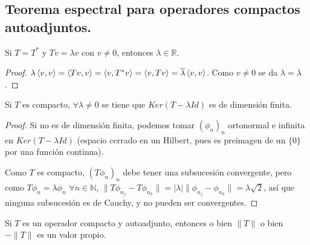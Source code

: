 \subsection{Teorema espectral para operadores compactos autoadjuntos.}

\begin{proposition}
  \label{prop:autoadj-real-eigenvalues}
  Si $T=T^*$ y  $Tv=\lambda v$ con $v\neq 0$, entonces $\lambda\in \mathbb{R}$.
\end{proposition}

\begin{proof}
  $\lambda \left\langle v,v\right\rangle =
  \left\langle Tv,v\right\rangle=\left\langle v,T^*v\right\rangle=\left\langle v,Tv\right\rangle=\overline{\lambda}\left\langle v,v\right\rangle$. Como
  $v\neq 0$ se da $\lambda=\overline{\lambda}$.
\end{proof}

\begin{proposition}
  \label{prop:eigenspaces-finite-dim}
  Si $T$ es compacto, $\forall \lambda\neq 0$ se tiene que $Ker(T-\lambda Id)$
  es de dimensión finita.
\end{proposition}

\begin{proof}
  Si no es de dimensión finita, podemos tomar $(\phi_n)_n$ ortonormal e infinita
  en $Ker(T-\lambda Id)$ (espacio cerrado en un Hilbert, pues es preimagen de un
  $\{0\}$ por una función continua).

  Como $T$ es compacto, $(T\phi_n)_n$ debe tener una subsucesión convergente,
  pero como $T\phi_n=\lambda \phi_n$ $\forall n\in \mathbb{N}$,
  $\|T\phi_{n_j}-T\phi_{n_k}\|=|\lambda|\|\phi_{n_j}-\phi_{n_k}\|=\lambda\sqrt{2}
  $, así que ninguna subsucesión es de Cauchy, y no pueden ser convergentes.
\end{proof}

\begin{proposition}
  \label{prop:norm-eigenval}
  Si $T$ es un operador compacto y autoadjunto, entonces o bien $\|T\|$ o bien
  $-\|T\|$ es un valor propio.
\end{proposition}

